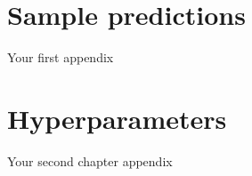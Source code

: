 \chapter{Sample predictions}
Your first appendix

\chapter{Hyperparameters}
Your second chapter appendix
